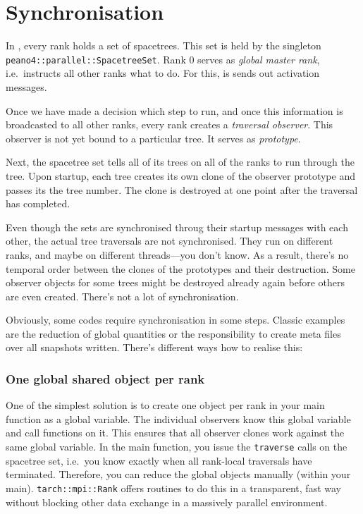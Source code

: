 \chapter{Synchronisation}
\label{section:synchronisation}


In \Peano, every rank holds a set of spacetrees.
This set is held by the singleton \texttt{peano4::parallel::SpacetreeSet}.
Rank 0 serves as \emph{global master rank}, i.e.~instructs all other ranks what
to do. 
For this, is sends out activation messages.


Once we have made a decision which step to run, and once this information is
broadcasted to all other ranks, every rank creates a \emph{traversal observer}.
This observer is not yet bound to a particular tree. 
It serves as \emph{prototype}.


Next, the spacetree set tells all of its trees on all of the ranks to run
through the tree. 
Upon startup, each tree creates its own clone of the observer prototype and
passes its the tree number.
The clone is destroyed at one point after the traversal has completed.


Even though the sets are synchronised throug their startup messages with each
other, 
the actual tree traversals are not synchronised.
They run on different ranks, and maybe on different threads---you don't know.
As a result, there's no temporal order between the clones of the prototypes and
their destruction.
Some observer objects for some trees might be destroyed already again before
others are even created.
There's not a lot of synchronisation.


Obviously, some codes require synchronisation in some steps.
Classic examples are the reduction of global quantities or the responsibility to
create meta files over all snapshots written.
There's different ways how to realise this:


\subsection*{One global shared object per rank}

One of the simplest solution is to create one object per rank in your main
function as a global variable.
The individual observers know this global variable and call functions on it.
This ensures that all observer clones work against the same global variable.
In the main function, you issue the \texttt{traverse} calls on the spacetree
set, i.e.~you know exactly when all rank-local traversals have terminated. 
Therefore, you can reduce the global objects manually (within your main).
\texttt{tarch::mpi::Rank} offers routines to do this in a transparent, fast way
without blocking other data exchange in a massively parallel environment.


